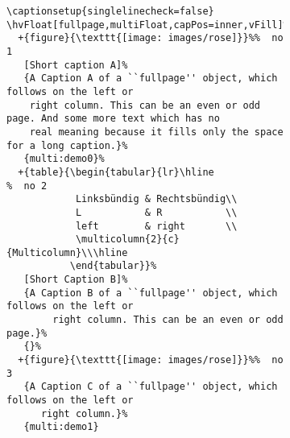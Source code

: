 \documentclass[twoside,paper=a4,usegeometry,index=totoc]{scrartcl}
\newcommand\Float[1][]{\ifx\relax#1\relax\marginnote{\fbox{float}}\else
   \marginnote{\fbox{\shortstack{float\\#1}}}\fi
}
\begin{document}
\begin{figure}[p]
\begin{figure}[p]
\begin{lstlisting}
\captionsetup{singlelinecheck=false}
\hvFloat[fullpage,multiFloat,capPos=inner,vFill]%
  +{figure}{\texttt{[image: images/rose]}}%%  no 1
   [Short caption A]%
   {A Caption A of a ``fullpage'' object, which follows on the left or
    right column. This can be an even or odd page. And some more text which has no
    real meaning because it fills only the space for a long caption.}%
   {multi:demo0}%
  +{table}{\begin{tabular}{lr}\hline                 %  no 2
            Linksbündig & Rechtsbündig\\
            L           & R           \\
            left        & right       \\
            \multicolumn{2}{c}{Multicolumn}\\\hline
           \end{tabular}}%
   [Short Caption B]%
   {A Caption B of a ``fullpage'' object, which follows on the left or
        right column. This can be an even or odd page.}%
   {}%
  +{figure}{\texttt{[image: images/rose]}}%%  no 3
   {A Caption C of a ``fullpage'' object, which follows on the left or
      right column.}%
   {multi:demo1}
\end{lstlisting}



\iffalse
\Float[Multi]
\captionsetup{singlelinecheck=false}
\hvFloat[fullpage,multiFloat,capPos=inner]%
  +{figure}{\texttt{[image: images/rose]}}%
   [Short caption A]%
   {A Caption A of a ``fullpage'' object, which follows on the left or
    right column. This can be an even or odd page. And some more text which has no
    real meaning because it fills only the space for a long caption.}%
   {multi:demo0}%
  +{table}{\begin{tabular}{lr}\hline                 %
            Linksbündig & Rechtsbündig\\
            L           & R           \\
            left        & right       \\
            \multicolumn{2}{c}{Multicolumn}\\\hline
           \end{tabular}}%
   [Short Caption B]%
   {A Caption B of a ``fullpage'' object, which follows on the left or
        right column. This can be an even or odd page.}{}%
  +{figure}{\texttt{[image: images/rose]}}%
   {A Caption C of a ``fullpage'' object, which follows on the left or
      right column.}%
   {multi:demo1}
\fi



\end{figure}
\end{figure}
\end{document}
